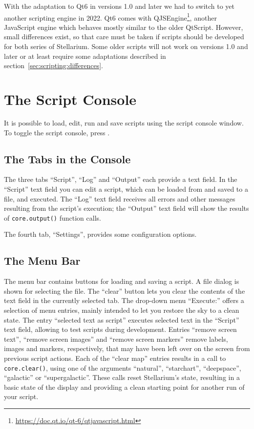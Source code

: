 With the adaptation to Qt6 in versions 1.0 and later we had to switch to 
yet another scripting engine in 2022. Qt6 comes with 
QJSEngine\footnote{\url{https://doc.qt.io/qt-6/qtjavascript.html}}, another 
JavaScript engine which behaves mostly similar to the older QtScript. 
However, small differences exist, so that care must be taken if scripts 
should be developed for both series of Stellarium. Some older scripts 
will not work on versions 1.0 and later or at least require some adaptations 
described in section~\ref{sec:scripting:differences}. 

\section{The Script Console}
\label{sec:scripting:console}
It is possible to load, edit, run and save scripts using the script
console window. To toggle the script console, press .  

\subsection{The Tabs in the Console}

The three tabs ``Script'', ``Log'' and ``Output'' each provide a text
field. In the ``Script'' text field you can edit a script,
which can be loaded from and saved to a file, and executed. The ``Log''
text field receives all errors and other messages resulting from the
script's execution; the ``Output'' text field will show the results of
\texttt{core.output()} function calls. 

The fourth tab, ``Settings'', provides some configuration options.

\subsection{The Menu Bar}

The menu bar contains buttons for loading and saving a script. A file
dialog is shown for selecting the file. The ``clear'' button lets you
clear the contents of the text field in the currently selected tab.
The drop-down menu ``Execute:'' offers a selection of menu entries, mainly
intended to let you restore the sky to a clean state. The entry
``selected text as script'' executes selected text in the ``Script'' text
field, allowing to test scripts during development. 
Entries ``remove screen text'', ``remove screen images'' and 
``remove screen markers'' remove labels, images and markers, respectively,
that may have been left over on the screen from previous script actions. 
Each of the ``clear map'' entries
results in a call to \texttt{core.clear()}, using one of the arguments
``natural'', ``starchart'', ``deepspace'', ``galactic'' or ``supergalactic''.
These calls reset Stellarium's state, resulting in a basic state
of the display and providing a clean starting point for another run of
your script.

